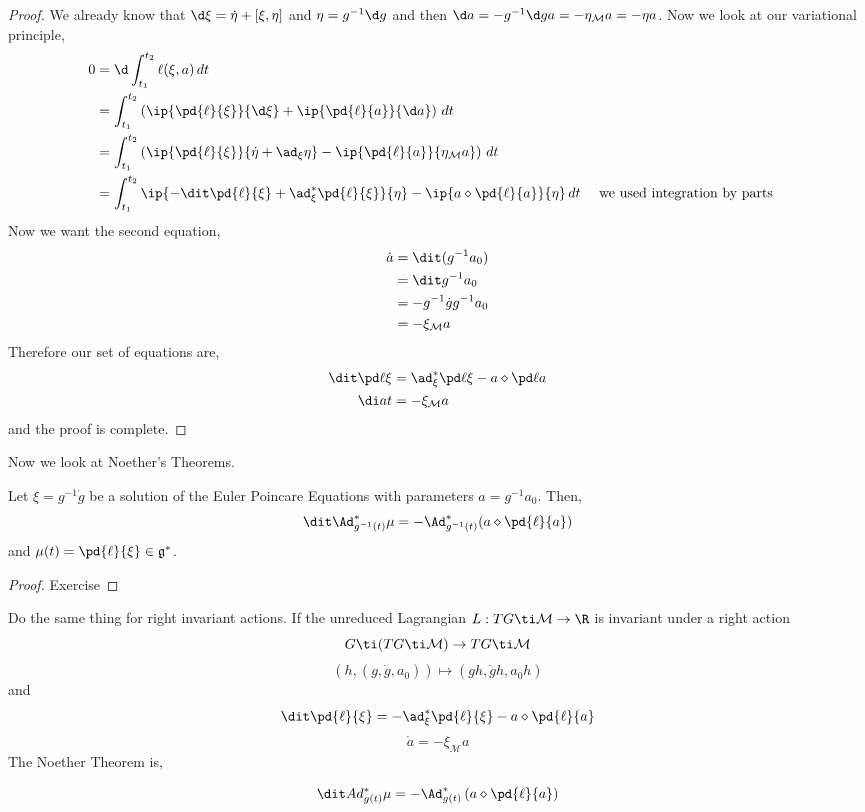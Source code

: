\begin{proof}
  We already know that $\d \xi = \dot \eta + [\xi, \eta]$ and $\eta = g^{-1}\d g$ and then $\d a = -g^{-1}\d g a = -\eta_{\mathcal{M}} a = -\eta a$. Now we look at our variational principle,
  \begin{align*}
    0 &= \d\int_{t_1}^{t_2} \ell(\xi, a)\, dt \\
    &= \int_{t_1}^{t_2} \left(\ip{\pd{\ell}{\xi}}{\d \xi} + \ip{\pd{\ell}{a}}{\d a}\right)\, dt \\
    &= \int_{t_1}^{t_2} \left(\ip{\pd{\ell}{\xi}}{\dot \eta + \ad_{\xi} \eta} - \ip{\pd{\ell}{a}}{\eta_\mathcal{M}a}\right)\, dt \\
    &= \int_{t_1}^{t_2} \ip{ -\dit \pd{\ell}{\xi} + \ad^*_\xi \pd{\ell}{\xi}}{\eta} - \ip{a \diamond \pd{\ell}{a}}{\eta}\, dt && \text{ we used integration by parts}
  \end{align*}
  Now we want the second equation,
  \begin{align*}
    \dot a &= \dit (g^{-1}a_0) \\
    &= \dit g^{-1} a_0 \\
    &= -g^{-1}\dot g g^{-1} a_0 \\
    &= -\xi_\mathcal{M} a
  \end{align*}
  Therefore our set of equations are,
  \begin{align}
    \dit\pd \ell \xi &= \ad^*_\xi \pd \ell \xi - a\diamond \pd \ell a\\
    \di a t &= -\xi_\mathcal{M}a
  \end{align}
  and the proof is complete.
\end{proof}

\noindent
Now we look at Noether's Theorems.
\begin{nthm}
  Let $\xi = g^{-1}\dot g$ be a solution of the Euler Poincare Equations with parameters $a = g^{-1}a_0$. Then,
  $$ \dit \Ad^*_{g^{-1}(t)} \mu = -\Ad^*_{g^{-1}(t)} (a \diamond \pd{\ell}{a}) $$
  and $\mu(t) = \pd{\ell}{\xi} \in \mathfrak{g}^*$.
\end{nthm}
\begin{proof}
  Exercise
\end{proof}

\begin{exercise}
  Do the same thing for right invariant actions. If the unreduced Lagrangian $L : TG \ti \mathcal{M} \to \R$ is invariant under a right action
  $$G \ti (TG \ti \mathcal{M}) \to TG \ti \mathcal{M}$$
  $$ (h, (g, \dot g, a_0)) \mapsto (gh, \dot g h, a_0h) $$
  and
  $$ \dit \pd{\ell}{\xi} = -\ad^*_\xi \pd{\ell}{\xi} - a\diamond \pd{\ell}{a} $$
  $$ \dot a = -\xi_\mathcal{M}a $$
  The Noether Theorem is,
  \begin{nthm}
    $$ \dit Ad^*_{g(t)} \mu = -\Ad^*_{g(t)} \left(a \diamond \pd{\ell}{a}\right) $$
  \end{nthm}
\end{exercise}

